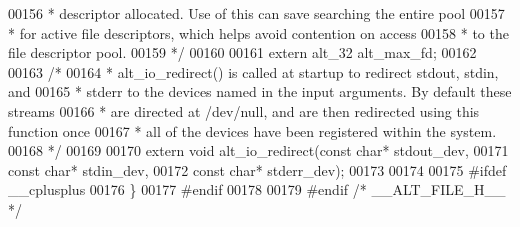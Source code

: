 \begin{DoxyCode}
00156 \textcolor{comment}{ * descriptor allocated. Use of this can save searching the entire pool}
00157 \textcolor{comment}{ * for active file descriptors, which helps avoid contention on access }
00158 \textcolor{comment}{ * to the file descriptor pool.}
00159 \textcolor{comment}{ */}
00160  
00161 extern alt_32 alt_max_fd;
00162 
00163 \textcolor{comment}{/*}
00164 \textcolor{comment}{ * alt\_io\_redirect() is called at startup to redirect stdout, stdin, and }
00165 \textcolor{comment}{ * stderr to the devices named in the input arguments. By default these streams}
00166 \textcolor{comment}{ * are directed at /dev/null, and are then redirected using this function once}
00167 \textcolor{comment}{ * all of the devices have been registered within the system. }
00168 \textcolor{comment}{ */}
00169 
00170 extern \textcolor{keywordtype}{void} alt_io_redirect(const \textcolor{keywordtype}{char}* stdout\_dev, 
00171                             const \textcolor{keywordtype}{char}* stdin\_dev, 
00172                             const \textcolor{keywordtype}{char}* stderr\_dev);
00173 
00174 
00175 \textcolor{preprocessor}{#ifdef \_\_cplusplus}
00176 \}
00177 \textcolor{preprocessor}{#endif}
00178 
00179 \textcolor{preprocessor}{#endif }\textcolor{comment}{/* \_\_ALT\_FILE\_H\_\_ */}\textcolor{preprocessor}{}
\end{DoxyCode}

